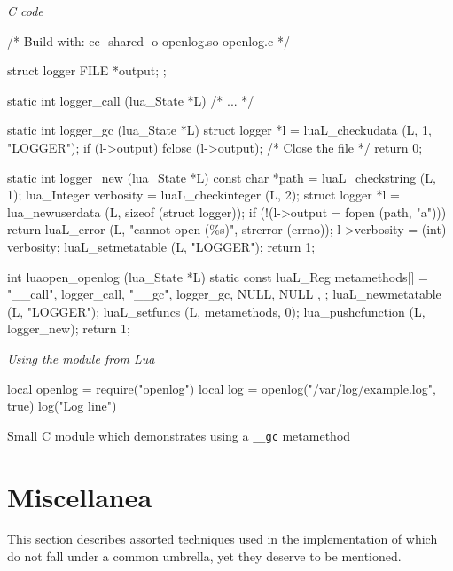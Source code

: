 
\begin{listing}[H]
  \small
  \begin{center}
    \emph{C code}
  \end{center}
\begin{ccode}
/* Build with: cc -shared -o openlog.so openlog.c */

struct logger {
  FILE *output;
};

static int logger_call (lua_State *L) { /* ... */ }

static int logger_gc (lua_State *L) {
  struct logger *l = luaL_checkudata (L, 1, "LOGGER");
  if (l->output) fclose (l->output); /* Close the file */
  return 0;
}

static int logger_new (lua_State *L) {
  const char *path = luaL_checkstring (L, 1);
  lua_Integer verbosity = luaL_checkinteger (L, 2);
  struct logger *l = lua_newuserdata (L, sizeof (struct logger));
  if (!(l->output = fopen (path, "a")))
    return luaL_error (L, "cannot open (\%s)", strerror (errno));
  l->verbosity = (int) verbosity;
  luaL_setmetatable (L, "LOGGER");
  return 1;
}

int luaopen_openlog (lua_State *L) {
  static const luaL_Reg metamethods[] = {
    { "__call", logger_call, }
    { "__gc", logger_gc, }
    { NULL, NULL },
  };
  luaL_newmetatable (L, "LOGGER");
  luaL_setfuncs (L, metamethods, 0);
  lua_pushcfunction (L, logger_new);
  return 1;
}
\end{ccode}

  \begin{center}
    \emph{Using the module from Lua}
  \end{center}

\begin{luacode}
  local openlog = require("openlog")
  local log = openlog("/var/log/example.log", true)
  log("Log line")
\end{luacode}

  \caption{Small C module which demonstrates using a \texttt{\_\_gc} metamethod}
  \label{lst:lua-gc-example-module}
\end{listing}


\section{Miscellanea}

This section describes assorted techniques used in the implementation of
\Eol* which do not fall under a common umbrella, yet they deserve to be
mentioned.

